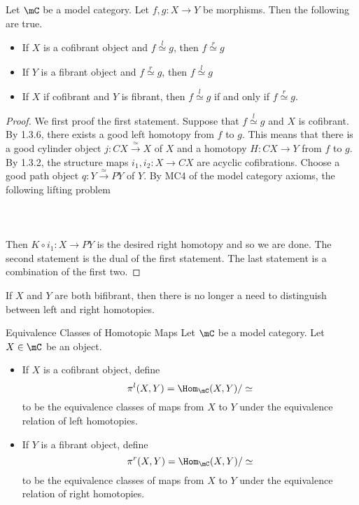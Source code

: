 \documentclass[a4paper]{article}
\begin{document}
\begin{thm}{}{} Let $\mC$ be a model category. Let $f,g:X\to Y$ be morphisms. Then the following are true. 
\begin{itemize}
\item If $X$ is a cofibrant object and $f\overset{l}{\simeq}g$, then $f\overset{r}{\simeq}g$
\item If $Y$ is a fibrant object and $f\overset{r}{\simeq}g$, then $f\overset{l}{\simeq}g$
\item If $X$ if cofibrant and $Y$ is fibrant, then $f\overset{l}{\simeq}g$ if and only if $f\overset{r}{\simeq}g$. 
\end{itemize} \tcbline
\begin{proof}
We first proof the first statement. Suppose that $f\overset{l}{\simeq}g$ and $X$ is cofibrant. By 1.3.6, there exists a good left homotopy from $f$ to $g$. This means that there is a good cylinder object $j:CX\overset{\simeq}{\longrightarrow} X$ of $X$ and a homotopy $H:CX\to Y$ from $f$ to $g$. By 1.3.2, the structure maps $i_1,i_2:X\to CX$ are acyclic cofibrations. Choose a good path object $q:Y\overset{\simeq}{\longrightarrow}PY$ of $Y$. By MC4 of the model category axioms, the following lifting problem \\~\\
\\~\\ 
Then $K\circ i_1:X\to PY$ is the desired right homotopy and so we are done. The second statement is the dual of the first statement. The last statement is a combination of the first two. 
\end{proof}
\end{thm}

If $X$ and $Y$ are both bifibrant, then there is no longer a need to distinguish between left and right homotopies. 

\begin{defn}{Equivalence Classes of Homotopic Maps}{} Let $\mC$ be a model category. Let $X\in\mC$ be an object. 
\begin{itemize}
\item If $X$ is a cofibrant object, define $$\pi^l(X,Y)=\Hom_\mC(X,Y)/\simeq$$ to be the equivalence classes of maps from $X$ to $Y$ under the equivalence relation of left homotopies. 
\item If $Y$ is a fibrant object, define $$\pi^r(X,Y)=\Hom_\mC(X,Y)/\simeq$$ to be the equivalence classes of maps from $X$ to $Y$ under the equivalence relation of right homotopies. 
\end{itemize}
\end{defn}
\end{document}

